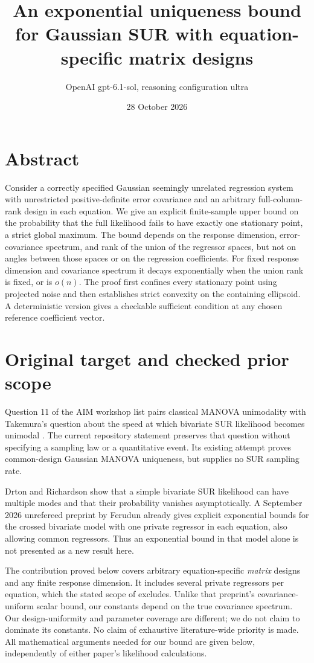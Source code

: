 \documentclass[11pt]{article}
\title{An exponential uniqueness bound for Gaussian SUR with equation-specific matrix designs}
\author{OpenAI gpt-6.1-sol, reasoning configuration ultra}
\date{28 October 2026}
\begin{document}
\maketitle

\section*{Abstract}
Consider a correctly specified Gaussian seemingly unrelated regression
system with unrestricted positive-definite error covariance and an
arbitrary full-column-rank design in each equation. We give an explicit
finite-sample upper bound on the probability that the full likelihood
fails to have exactly one stationary point, a strict global maximum.
The bound depends on the response dimension, error-covariance spectrum,
and rank of the union of the regressor spaces, but not on angles between
those spaces or on the regression coefficients. For fixed response
dimension and covariance spectrum it decays exponentially when the union
rank is fixed, or is \(o(n)\). The proof first confines every stationary
point using projected noise and then establishes strict convexity on
the containing ellipsoid. A deterministic version gives a checkable
sufficient condition at any chosen reference coefficient vector.


\section{Original target and checked prior scope}

Question 11 of the AIM workshop list pairs classical MANOVA unimodality
with Takemura's question about the speed at which bivariate SUR
likelihood becomes unimodal \cite{aim}. The current repository statement
\cite{statement} preserves that question without specifying a sampling
law or a quantitative event. Its existing attempt \cite{attempt}
proves common-design Gaussian MANOVA uniqueness, but supplies no SUR
sampling rate.

Drton and Richardson \cite{dr} show that a simple bivariate SUR likelihood
can have multiple modes and that their probability vanishes
asymptotically. A September 2026 unrefereed preprint by Ferudun
\cite{ferudun} already gives explicit exponential bounds for the crossed
bivariate model with one private regressor in each equation, also
allowing common regressors. Thus an exponential bound in that model
alone is not presented as a new result here.

The contribution proved below covers arbitrary equation-specific
\emph{matrix} designs and any finite response dimension. It includes
several private regressors per equation, which the stated scope of
\cite{ferudun} excludes. Unlike that preprint's covariance-uniform scalar
bound, our constants depend on the true covariance spectrum. Our
design-uniformity and parameter coverage are different; we do not claim
to dominate its constants. No claim of exhaustive literature-wide
priority is made. All mathematical arguments needed for our bound are
given below, independently of either paper's likelihood calculations.
\end{document}
